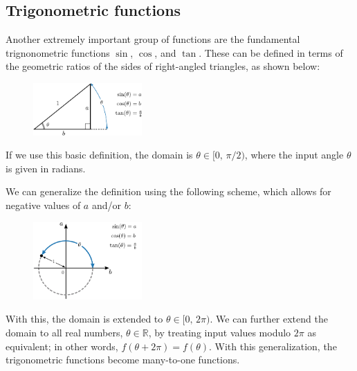 \documentclass[10pt,a4paper]{article}
\begin{document}
\clearpage

\subsection{Trigonometric functions}
\label{trigonometric-functions}

Another extremely important group of functions are the fundamental
trignonometric functions $\sin$, $\cos$, and $\tan$. These can be
defined in terms of the geometric ratios of the sides of right-angled
triangles, as shown below:

\begin{figure}[h!]
  \centering\includegraphics[width=0.37\textwidth]{trigonometry}
\end{figure}

\noindent
If we use this basic definition, the domain is $\theta \in [0,
  \,\pi/2)$, where the input angle $\theta$ is given in radians.

We can generalize the definition using the following scheme, which
allows for negative values of $a$ and/or $b$:

\begin{figure}[h!]
  \centering\includegraphics[width=0.37\textwidth]{trigonometry2}
\end{figure}

\noindent
With this, the domain is extended to $\theta \in [0,\,2\pi)$. We can
further extend the domain to all real numbers, $\theta \in
\mathbb{R}$, by treating input values modulo $2\pi$ as equivalent; in
other words, $f(\theta + 2\pi) = f(\theta)$. With this generalization,
the trigonometric functions become many-to-one functions.
\end{document}
